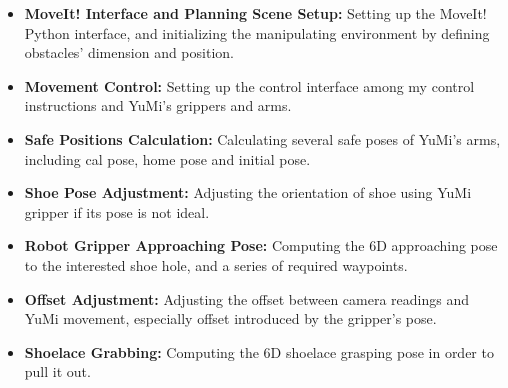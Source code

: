 \begin{itemize}
    \item \textbf{MoveIt! Interface and Planning Scene Setup:} Setting up the MoveIt! Python interface, and initializing the manipulating environment by defining obstacles' dimension and position.
    \item \textbf{Movement Control:} Setting up the control interface among my control instructions and YuMi's grippers and arms.
    \item \textbf{Safe Positions Calculation:} Calculating several safe poses of YuMi's arms, including cal pose, home pose and initial pose.
    \item \textbf{Shoe Pose Adjustment:} Adjusting the orientation of shoe using YuMi gripper if its pose is not ideal. 
    \item \textbf{Robot Gripper Approaching Pose:} Computing the 6D approaching pose to the interested shoe hole, and a series of required waypoints.
    \item \textbf{Offset Adjustment:} Adjusting the offset between camera readings and YuMi movement, especially offset introduced by the gripper's pose.
    \item \textbf{Shoelace Grabbing:} Computing the 6D shoelace grasping pose in order to pull it out.
\end{itemize}



